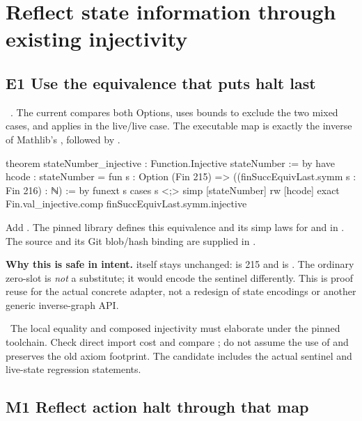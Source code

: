 \section{Reflect state information through existing injectivity}

\subsection{E1 Use the equivalence that puts halt last}

\ . The current  compares both Options, uses bounds to exclude the two mixed cases, and applies  in the live/live case. The executable map is exactly the inverse of Mathlib's , followed by .

\begin{Lean}
theorem stateNumber_injective : Function.Injective stateNumber := by
  have hcode : stateNumber = fun s : Option (Fin 215) =>
      ((finSuccEquivLast.symm s : Fin 216) : ℕ) := by
    funext s
    cases s <;> simp [stateNumber]
  rw [hcode]
  exact Fin.val_injective.comp finSuccEquivLast.symm.injective
\end{Lean}

Add . The pinned library defines this equivalence and its simp laws for  and  in . The source and its Git blob/hash binding are supplied in .

\textbf{Why this is safe in intent.}  itself stays unchanged:  is 215 and  is . The ordinary zero-slot  is \emph{not} a substitute; it would encode the sentinel differently. This is proof reuse for the actual concrete adapter, not a redesign of state encodings or another generic inverse-graph API.

\risk\ The local equality and composed injectivity must elaborate under the pinned toolchain. Check direct import cost and compare ; do not assume the use of  and  preserves the old axiom footprint. The candidate includes the actual sentinel and live-state regression statements.

\subsection{M1 Reflect action halt through that map}

